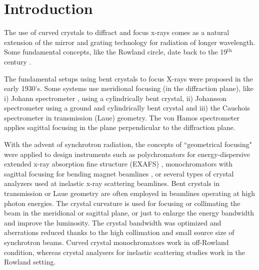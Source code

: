 \documentclass[preprint]{iucr}              %
\newcommand{\todo}[1]{{\color{red}[TODO: "#1'']}}
\newcommand{\inred}[1]{{\color{red}#1}}
\begin{document}
\section{Introduction}

The use of curved crystals to diffract and focus x-rays \inred{comes as} a natural extension of the mirror and grating technology for radiation of longer wavelength. Some fundamental concepts, like the Rowland circle, date back to the 19$^\text{th}$ century \cite{rowland1882}.

The fundamental setups using bent crystals to focus X-rays were proposed in the early 1930’s. Some systems use meridional focusing (in the diffraction plane), like i) Johann spectrometer \cite{Johann1931}, \inred{using} a cylindrically bent crystal,  ii) Johansson spectrometer \cite{Johansson1933} \inred{using} a ground and cylindrically bent crystal and iii) the Cauchois spectrometer \cite{cauchois1933} in transmission (Laue) geometry. The von Hamos spectrometer \cite{V.Hamos1933} applies sagittal focusing in the plane perpendicular to the diffraction plane.

With the advent of synchrotron radiation, the concepts of ``geometrical focusing" were applied to design instruments such as polychromators for energy-dispersive extended x-ray absorption fine structure (EXAFS) \cite{Tolentino:ms0206}, monochromators with sagittal focusing for bending magnet beamlines \cite{Sparks1980}, or several types of crystal analyzers \inred{used} at inelastic x-ray scattering beamlines. Bent crystals in transmission or Laue geometry are often employed in beamlines operating at high photon energies. The crystal curvature is used for focusing or collimating the beam in the meridional \cite{Suortti1988,SuorttiShulze} or sagittal \cite{Zhong2001} plane, or just to enlarge the energy bandwidth and improve the luminosity. The crystal bandwidth was optimized and aberrations reduced thanks to \inred{the high collimation and small source size} of synchrotron beams. Curved crystal monochromators work \inred{in} off-Rowland condition, whereas crystal analysers for inelastic scattering studies \inred{work in} the Rowland setting.

\end{document}
